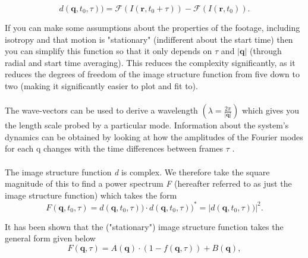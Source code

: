 \documentclass[11pt]{article}
\begin{document}
\begin{equation}
    d(\textbf{q}, t_0, \tau) ) = \mathscr{F}(I(\mathbf{r}, t_0 + \tau)) - \mathscr{F}(I(\mathbf{r}, t_0)).
\end{equation}

If you can make some assumptions about the properties of the footage, including isotropy and that motion is "stationary" (indifferent about the start time) \cite{ddm1} then you can simplify this function so that it only depends on $\tau$ and $|\textbf{q}|$ (through radial and start time averaging). This reduces the complexity significantly, as it reduces the degrees of freedom of the image structure function from five down to two (making it significantly easier to plot and fit to).
\\\\
The wave-vectors can be used to derive a wavelength $(\lambda = \frac{2\pi}{|\textbf{q}|})$ which gives you the length scale probed by a particular mode.
Information about the system's dynamics can be obtained by looking at how the amplitudes of the Fourier modes for each q changes with the time differences between frames $\tau$ \cite{ddm2}.
\\\\
The image structure function \textit{d} is complex. We therefore take the square magnitude of this to find a power spectrum \textit{F} (hereafter referred to as just the image structure function) which takes the form
\begin{equation}
F(\textbf{q}, t_0, \tau) = d(\textbf{q}, t_0, \tau)) \cdot d(\textbf{q}, t_0, \tau) )^{*} = |d(\textbf{q}, t_0, \tau) )|^2.
\end{equation}

It has been shown that the ("stationary") image structure function takes the general form given below \cite{ddm1}
\begin{equation}
	F(\textbf{q}, \tau) = A(\textbf{q}) \cdot (1 - f(\textbf{q}, \tau)) + B(\textbf{q}),
\end{equation}
\end{document}
